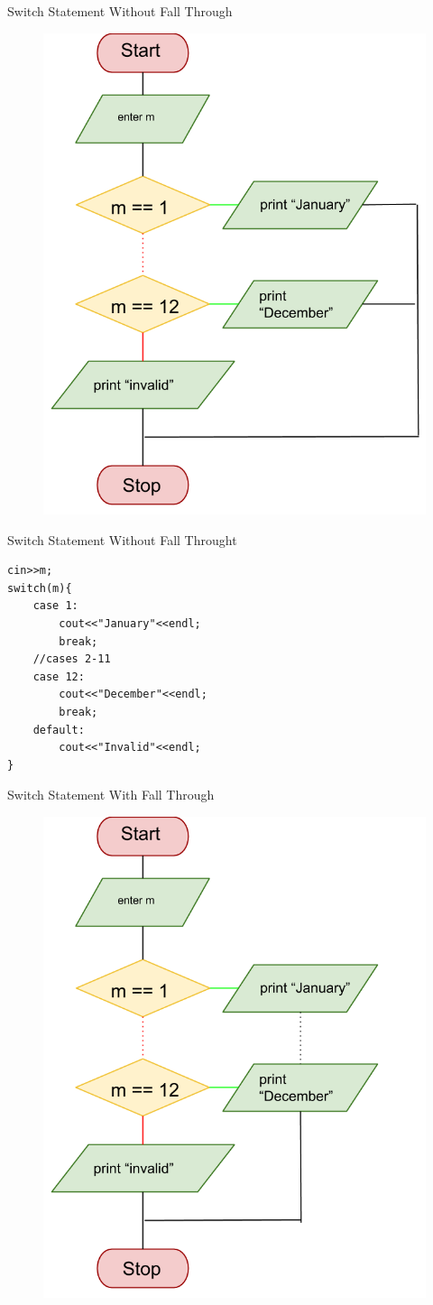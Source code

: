 \documentclass[xcolor={dvipsnames}]{beamer}
\begin{document}
\begin{frame}{Switch Statement Without Fall Through}
\begin{center}	
	\begin{figure}
		\includegraphics[width=.6\textwidth]{switch}
	\end{figure}
	\end{center}
\end{frame}

\begin{frame}[fragile]{Switch Statement Without Fall Throught}
\begin{verbatim}
cin>>m;
switch(m){
    case 1: 
        cout<<"January"<<endl; 
        break;
    //cases 2-11
    case 12:
        cout<<"December"<<endl;
        break;
    default:
        cout<<"Invalid"<<endl;
}
\end{verbatim}
\end{frame}

\begin{frame}{Switch Statement With Fall Through}
\begin{center}	
	\begin{figure}
		\includegraphics[width=.6\textwidth]{switchnofall}
	\end{figure}
	\end{center}
\end{frame}
\end{document}
